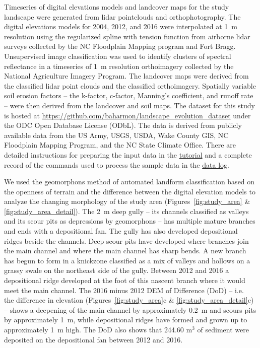 \documentclass[gmd, manuscript]{copernicus}
\begin{document}
Timeseries of digital elevations models 
and landcover maps for the study landscape
were generated from lidar pointclouds and orthophotography.
The digital elevations models for 2004, 2012, and 2016
were interpolated at 1~\unit{m} resolution
using the regularized spline with tension function \citep{Mitasova1993,Mitasova2005}
from airborne lidar surveys 
collected by the NC Floodplain Mapping program and Fort Bragg. 
%
Unsupervised image classification 
was used to identify clusters of spectral reflectance
in a timeseries of 1~\unit{m} resolution orthoimagery 
collected by the National Agriculture Imagery Program.
The landcover maps were derived from the
classified lidar point clouds and the classified orthoimagery.
Spatially variable soil erosion factors 
-- the k-factor, c-factor, Manning's coefficient, and runoff rate --
were then derived from the landcover and soil maps.
The dataset for this study is hosted at 
\url{https://github.com/baharmon/landscape\_evolution_dataset}
under the ODC Open Database License (ODbL).
The data is derived from publicly available data from
the US Army, USGS, USDA, Wake County GIS, NC Floodplain
Mapping Program, and the NC State Climate Office.
There are detailed instructions for preparing the input data in the 
\href{https://github.com/baharmon/landscape_evolution/blob/master/tutorial.md}{tutorial}
and a complete record of the commands used to process the sample data in the
\href{https://github.com/baharmon/landscape_evolution_dataset/blob/master/nc_spm_evolution/DATA.md}{data log}.

We used the geomorphons method 
of automated landform classification
based on the openness of terrain \citep{Jasiewicz2013}
and the difference between the digital elevation models 
to analyze the changing morphology of the study area
(Figures~\ref{fig:study_area} \& \ref{fig:study_area_detail}). 
%
The 2~\unit{m} deep gully -- 
its channels classified as valleys and 
its scour pits as depressions by geomorphons -- 
has multiple mature branches
and ends with a depositional fan.
%
The gully has also developed 
depositional ridges beside the channels.
Deep scour pits have developed 
where branches join the main channel 
and where the main channel has sharp bends.
%
A new branch has begun to form 
in a knickzone classified as a mix of valleys and hollows
on a grassy swale on the northeast side of the gully.
Between 2012 and 2016 a depositional ridge
developed at the foot of this nascent branch
where it would meet the main channel. 
%
The 2016 minus 2012 DEM of Difference (DoD) -- 
i.e.~ the difference in elevation 
(Figures~\ref{fig:study_area}c \& \ref{fig:study_area_detail}c) --
shows a deepening of the main channel 
by approximately 0.2~\unit{m} 
and scours pits by approximately 1~\unit{m},
while depositional ridges have formed and grown up to
approximately 1~\unit{m} high.
%
The DoD also shows that
244.60 \unit{m}$^3$ of sediment were deposited
on the depositional fan between 2012 and 2016.
\end{document}
